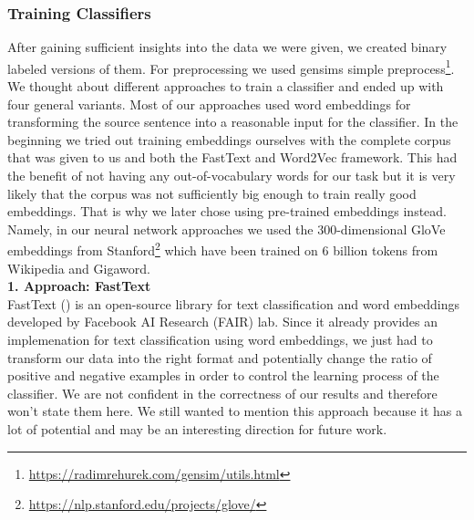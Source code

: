 \subsubsection{Training Classifiers}
After gaining sufficient insights into the data we were given, we created binary labeled versions of them. For preprocessing we used gensims simple preprocess\footnote[2]{\url{https://radimrehurek.com/gensim/utils.html}}. We thought about different approaches to train a classifier and ended up with four general variants. Most of our approaches used word embeddings for transforming the source sentence into a reasonable input for the classifier. In the beginning we tried out training embeddings ourselves with the complete corpus that was given to us and both the FastText and Word2Vec framework. This had the benefit of not having any out-of-vocabulary words for our task but it is very likely that the corpus was not sufficiently big enough to train really good embeddings. That is why we later chose using pre-trained embeddings instead. Namely, in our neural network approaches we used the $300$-dimensional GloVe embeddings from Stanford\footnote[3]{\url{https://nlp.stanford.edu/projects/glove/}} which have been trained on 6 billion tokens from Wikipedia and Gigaword. \\

\textbf{1. Approach: FastText}\\
FastText (\cite{joulin2016bag}) is an open-source library for text classification and word embeddings developed by Facebook AI Research (FAIR) lab. Since it already provides an implemenation for text classification using word embeddings, we just had to transform our data into the right format and potentially change the ratio of positive and negative examples in order to control the learning process of the classifier. We are not confident in the correctness of our results and therefore won't state them here. We still wanted to mention this approach because it has a lot of potential and may be an interesting direction for future work.\\

